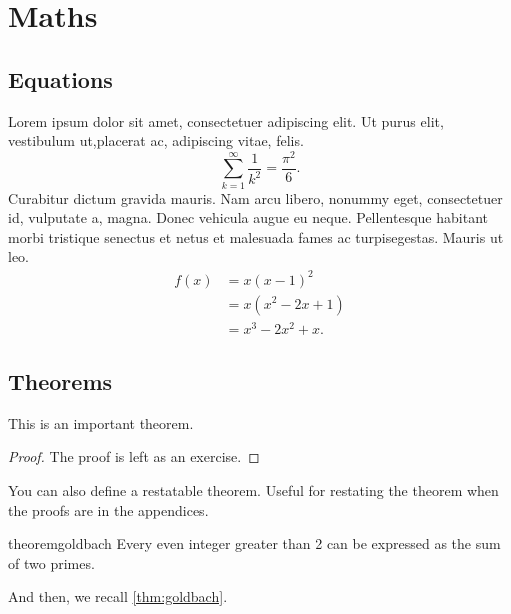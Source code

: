 
\chapter{Maths}

\section{Equations}

Lorem ipsum dolor sit amet, consectetuer adipiscing elit. Ut purus elit, vestibulum ut,placerat ac, adipiscing vitae, felis.
\begin{equation}
    \sum_{k=1}^\infty \frac{1}{k^2} = \frac{\pi^2}{6}.
\end{equation}
Curabitur dictum gravida mauris. Nam arcu libero, nonummy eget, consectetuer id, vulputate a, magna. Donec vehicula augue eu neque. Pellentesque habitant morbi tristique senectus et netus et malesuada fames ac turpisegestas. Mauris ut leo.
\begin{align*}
    f(x) &= x(x-1)^2 \\
    &= x(x^2-2x+1) \\
    &= x^3-2x^2+x.
\end{align*}

\section{Theorems}

\begin{theorem}
    This is an important theorem.
\end{theorem}
\begin{proof}
    The proof is left as an exercise.
\end{proof}
You can also define a restatable theorem. Useful for restating the theorem when the proofs are in the appendices.
\begin{restatable}{theorem}{goldbach}
    \label{thm:goldbach}
    Every even integer greater than 2 can be expressed as the sum of two primes.
\end{restatable}
And then, we recall \cref{thm:goldbach}.
\goldbach*
